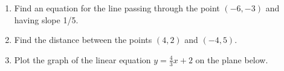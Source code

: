 \documentclass{article}
\begin{document}
\HomeworkTitle[class={College Algebra}, number={3}, name={Lines and Circles}]

\begin{enumerate}
\item Find an equation for the line passing through the point $(-6, -3)$ and having slope 1/5. \vspace{5cm}

\item Find the distance between the points $(4, 2)$ and $(-4, 5)$. \vspace{5cm}

\item Plot the graph of the linear equation $y = \frac{4}{3} x + 2$ on the plane below.\begin{center}
\CartesianPlane[h=7,w=7,axes=yes]
\end{center}

  
\end{enumerate}
\end{document}
